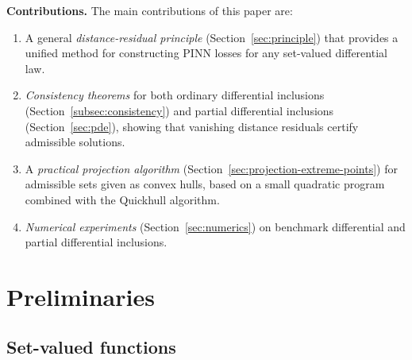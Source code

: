 \documentclass[11pt]{elsarticle}
\theoremstyle{definition}
\theoremstyle{remark}
\numberwithin{equation}{section}
\begin{document}
	\vspace{0.3cm}
	
	\noindent\textbf{Contributions. }
	The main contributions of this paper are:
	\begin{enumerate}
		\item A general \emph{distance-residual principle} (Section~\ref{sec:principle})
		that provides a unified method for constructing PINN losses for any
		set-valued differential law.
		\item \emph{Consistency theorems} for both ordinary differential
		inclusions (Section~\ref{subsec:consistency}) and  partial
		differential inclusions (Section~\ref{sec:pde}), showing that
		vanishing distance residuals certify admissible solutions.
		\item A \emph{practical projection algorithm} (Section~\ref{sec:projection-extreme-points})
		for admissible sets given as convex hulls, based on a small quadratic
		program combined with the Quickhull algorithm.
		\item \emph{Numerical experiments} (Section~\ref{sec:numerics}) on
		benchmark differential and partial differential inclusions.
	\end{enumerate}
	
%	
%	
	
	\section{Preliminaries}
	\label{sec:preliminaries}
	
	\subsection{Set-valued functions}
	
\end{document}
